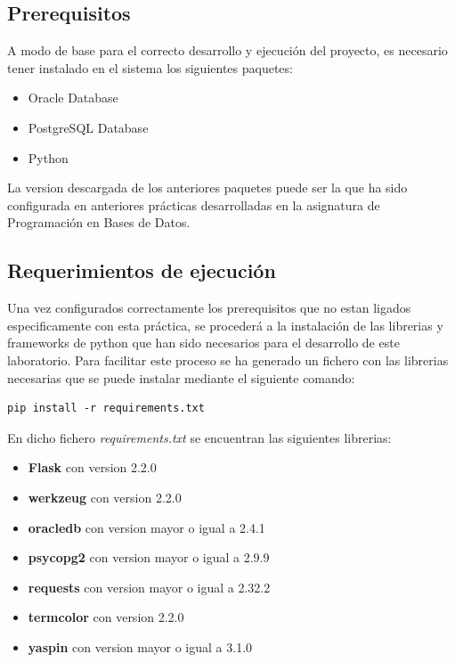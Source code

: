 \documentclass[a4paper,12pt]{article}
\begin{document}
\subsection{Prerequisitos}
A modo de base para el correcto desarrollo y ejecución del proyecto, es necesario tener instalado en el sistema los siguientes paquetes:
\begin{itemize}
    \item Oracle Database
    \item PostgreSQL Database
    \item Python 
\end{itemize}

La version descargada de los anteriores paquetes puede ser la que ha sido configurada en anteriores prácticas 
desarrolladas en la asignatura de Programación en Bases de Datos.

\subsection{Requerimientos de ejecución}
Una vez configurados correctamente los prerequisitos que no estan ligados especificamente con esta práctica,
se procederá a la instalación de las librerias y frameworks de python que han sido necesarios para el desarrollo de este laboratorio.
Para facilitar este proceso se ha generado un fichero con las librerias necesarias que se puede instalar mediante el siguiente comando:

\begin{lstlisting}[style=console]
    pip install -r requirements.txt
\end{lstlisting}

En dicho fichero \textit{requirements.txt} se encuentran las siguientes librerias:
\begin{itemize}
    \item \textbf{Flask} con version 2.2.0
    \item \textbf{werkzeug} con version 2.2.0
    \item \textbf{oracledb} con version mayor o igual a 2.4.1
    \item \textbf{psycopg2} con version mayor o igual a 2.9.9
    \item \textbf{requests} con version mayor o igual a 2.32.2
    \item \textbf{termcolor} con version 2.2.0
    \item \textbf{yaspin} con version mayor o igual a 3.1.0
\end{itemize}
\end{document}
